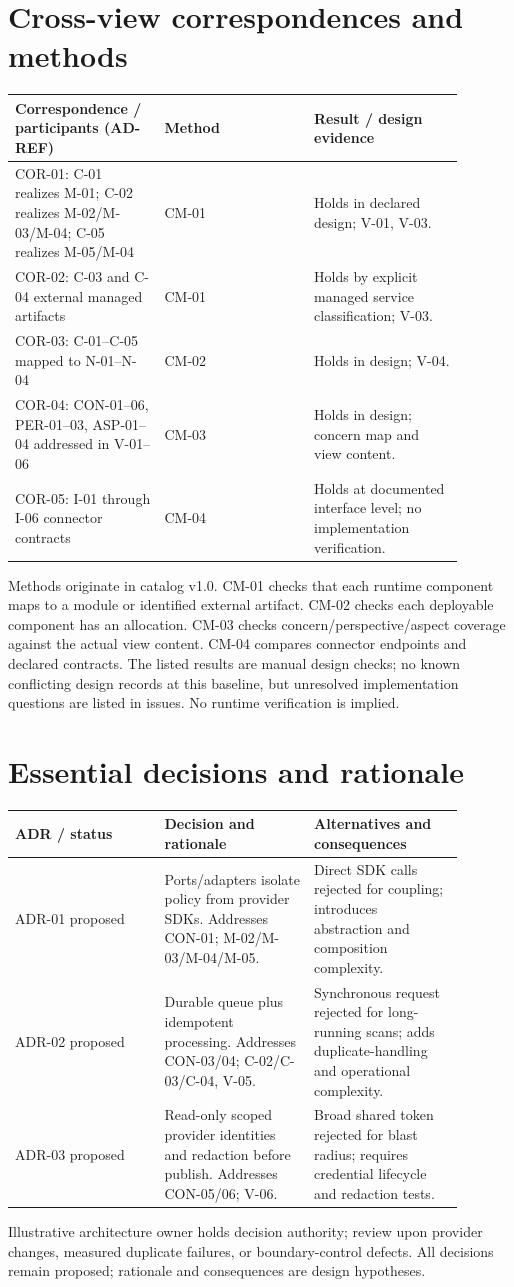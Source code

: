 \documentclass[11pt,letterpaper]{article}
\newcommand{\docsection}[1]{\Needspace{5\baselineskip}\section{#1}}
\begin{document}
\docsection{Cross-view correspondences and methods}
\begin{longtable}{@{}>{\RaggedRight\arraybackslash}p{0.297\linewidth}>{\RaggedRight\arraybackslash}p{0.297\linewidth}>{\RaggedRight\arraybackslash}p{0.297\linewidth}@{}}
\toprule
\textbf{Correspondence / participants (AD-REF)} & \textbf{Method} & \textbf{Result / design evidence}\\\midrule
\endhead
COR-01: C-01 realizes M-01; C-02 realizes M-02/M-03/M-04; C-05 realizes M-05/M-04 & CM-01 & Holds in declared design; V-01, V-03.\\
COR-02: C-03 and C-04 external managed artifacts & CM-01 & Holds by explicit managed service classification; V-03.\\
COR-03: C-01--C-05 mapped to N-01--N-04 & CM-02 & Holds in design; V-04.\\
COR-04: CON-01--06, PER-01--03, ASP-01--04 addressed in V-01--06 & CM-03 & Holds in design; concern map and view content.\\
COR-05: I-01 through I-06 connector contracts & CM-04 & Holds at documented interface level; no implementation verification.\\
\bottomrule
\end{longtable}
Methods originate in catalog v1.0. CM-01 checks that each runtime component maps to a module or identified external artifact. CM-02 checks each deployable component has an allocation. CM-03 checks concern/perspective/aspect coverage against the actual view content. CM-04 compares connector endpoints and declared contracts. The listed results are manual design checks; no known conflicting design records at this baseline, but unresolved implementation questions are listed in issues. No runtime verification is implied.

\docsection{Essential decisions and rationale}
\begin{longtable}{@{}>{\RaggedRight\arraybackslash}p{0.297\linewidth}>{\RaggedRight\arraybackslash}p{0.297\linewidth}>{\RaggedRight\arraybackslash}p{0.297\linewidth}@{}}
\toprule
\textbf{ADR / status} & \textbf{Decision and rationale} & \textbf{Alternatives and consequences}\\\midrule
\endhead
ADR-01 proposed & Ports/adapters isolate policy from provider SDKs. Addresses CON-01; M-02/M-03/M-04/M-05. & Direct SDK calls rejected for coupling; introduces abstraction and composition complexity.\\
ADR-02 proposed & Durable queue plus idempotent processing. Addresses CON-03/04; C-02/C-03/C-04, V-05. & Synchronous request rejected for long-running scans; adds duplicate-handling and operational complexity.\\
ADR-03 proposed & Read-only scoped provider identities and redaction before publish. Addresses CON-05/06; V-06. & Broad shared token rejected for blast radius; requires credential lifecycle and redaction tests.\\
\bottomrule
\end{longtable}
Illustrative architecture owner holds decision authority; review upon provider changes, measured duplicate failures, or boundary-control defects. All decisions remain proposed; rationale and consequences are design hypotheses.
\end{document}
